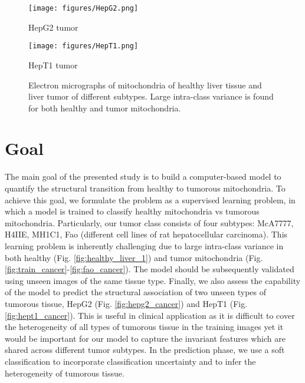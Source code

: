		\newpage
		\hfill
		\begin{figure}[tbp!]
			\begin{minipage}[b]{0.48\textwidth}      
		                \texttt{[image: figures/HepG2.png]}%
		               
		               
		                 \caption{HepG2 tumor}
		                  \label{fig:hepg2_cancer}
		   \end{minipage}
		   \hfill
		   \begin{minipage}[b]{0.48\textwidth}    
		 		  
		                \texttt{[image: figures/HepT1.png]}%
		
		                 \caption{HepT1 tumor}
		                         \label{fig:hept1_cancer}
		\end{minipage}
		
		    \caption{Electron micrographs of mitochondria of healthy liver tissue and liver tumor of different subtypes. Large intra-class variance is found for both healthy and tumor mitochondria.}
		    \label{fig:mitochondria}
		\end{figure}
		\section{Goal}
		The main goal of the presented study is to build a computer-based model to quantify the structural transition from healthy to tumorous mitochondria. To achieve this goal, we formulate the problem as a supervised learning problem, in which a model is trained to classify healthy mitochondria vs tumorous mitochondria. Particularly, our tumor class consists of four subtypes: McA7777, H4IIE, MH1C1, Fao (different cell lines of rat hepatocellular carcinoma). This learning problem is inherently
		challenging due to large intra-class variance in both healthy (Fig. \ref{fig:healthy_liver_1}) and tumor mitochondria (Fig. \ref{fig:train_cancer}-\ref{fig:fao_cancer}). The model should be subsequently validated using unseen images of the same tissue type. Finally, we also assess the capability of the model to predict the structural association of two unseen types of tumorous tissue, HepG2 (Fig. \ref{fig:hepg2_cancer}) and HepT1 (Fig. \ref{fig:hept1_cancer}). This
		is useful in clinical application as it is difficult to cover the heterogeneity of all types of tumorous tissue in the training images yet it would be important for our model to capture the invariant features which are shared across different tumor subtypes. In the prediction phase, we use a soft classification to incorporate classification uncertainty and to infer the heterogeneity of tumorous tissue.   
		
